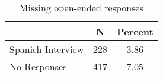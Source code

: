 \begin{table}[ht]
\centering
\begin{tabular}{lcc}
  \hline
 & N & Percent \\ 
  \hline
Spanish Interview & 228 & 3.86 \\ 
  No Responses & 417 & 7.05 \\ 
   \hline
\end{tabular}
\caption{Missing open-ended responses} 
\label{tab:appB1mis}
\end{table}
